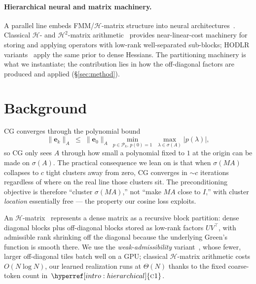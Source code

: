\documentclass[acmtog,anonymous,review]{acmart}
\theoremstyle{plain}
\begin{document}
\paragraph{Hierarchical neural and matrix machinery.}
A parallel line embeds FMM/$\mathcal{H}$-matrix structure into neural
architectures~\cite{Fan2019multiscale,li2020multipole,Fognini2025neural,Sittoni2026neural,Xu2025neural,Lyu2026multigrid,Luz2020learning}.
Classical $\mathcal{H}$- and $\mathcal{H}^2$-matrix
arithmetic~\cite{hackbusch1999sparse,hackbusch2002adaptive,borm2003introduction} provides
near-linear-cost machinery for storing and applying operators with low-rank
well-separated sub-blocks; HODLR variants~\cite{Hartland2023hodlr} apply the same prior
to dense Hessians. The partitioning machinery is what we instantiate; the contribution
lies in how the off-diagonal factors are produced and applied (\S\ref{sec:method}).

\section{Background}
\label{sec:background}

CG converges through the polynomial bound
\begin{equation}
  \|\mathbf{e}_k\|_A
  \;\le\; \|\mathbf{e}_0\|_A\,\min_{p\in\mathcal{P}_k,\,p(0)=1}\;
          \max_{\lambda\in\sigma(A)}|p(\lambda)|,
  \label{eq:cg-poly}
\end{equation}
so CG only sees $A$ through how small a polynomial fixed to $1$ at the origin can be made on
$\sigma(A)$. The practical consequence we lean on is that when $\sigma(MA)$ collapses to $c$
tight clusters away from zero, CG converges in $\sim\!c$ iterations regardless of where on
the real line those clusters sit. The preconditioning objective is therefore ``cluster
$\sigma(MA)$,'' not ``make $MA$ close to $I$,'' with cluster \emph{location} essentially
free --- the property our cosine loss exploits.

An $\mathcal{H}$-matrix~\cite{hackbusch1999sparse,hackbusch2002adaptive,borm2003introduction}
represents a dense matrix as a recursive block partition: dense diagonal blocks plus
off-diagonal blocks stored as low-rank factors $UV^\top$, with admissible rank shrinking
off the diagonal because the underlying Green's function is smooth there. We use the
\emph{weak-admissibility} variant~\cite{hackbusch2002adaptive,Hartland2023hodlr}, whose
fewer, larger off-diagonal tiles batch well on a GPU; classical $\mathcal{H}$-matrix
arithmetic costs $O(N\log N)$, our learned realization runs at $\Theta(N)$ thanks to the
fixed coarse-token count in~$\hyperref[intro:hierarchical]{\textsc{c1}}$.
\end{document}
